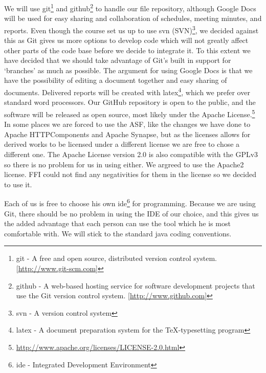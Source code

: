     We will use \gls{git}\footnote{\gls{git} - A free and open source, distributed version control system. [\url{http://www.git-scm.com}]} and \gls{github}\footnote{\gls{github} - A web-based hosting service for software development projects that use the Git version control system. [\url{http://www.github.com}]} to handle our file repository, although Google Docs will be used for easy sharing and collaboration of schedules, meeting minutes, and reports. Even though the course set us up to use \gls{svn} (SVN)\footnote{\gls{svn} - A version control system}, we decided against this as Git gives us more options to develop code which will not greatly affect other parts of the code base before we decide to integrate it. To this extent we have decided that we should take advantage of Git’s built in support for ‘branches’ as much as possible. The argument for using Google Docs is that we have the possibility of editing a document together and easy sharing of documents. Delivered reports will be created with \gls{latex}\footnote{\gls{latex} - A document preparation system for the \TeX -typesetting program}, which we prefer over standard word processors. Our GitHub repository is open to the public, and the software will be released as open source, most likely under the Apache License.\footnote{\url{http://www.apache.org/licenses/LICENSE-2.0.html}} In some places we are forced to use the ASF, like the changes we have done to Apache HTTPComponents and Apache Synapse, but as the licenses allows for derived works to be licensed under a different license we are free to chose a different one. The Apache License version 2.0 is also compatible with the GPLv3 so there is no problem for us in using either. 
    We argreed to use the Apache2 license. FFI could not find any negativities for them in the license so we decided to use it. 

    Each of us is free to choose his own \gls{ide}\footnote{\gls{ide} - Integrated Development Environment} for programming. Because we are using Git, there should be no problem in using the IDE of our choice, and this gives us the added advantage that each person can use the tool which he is most comfortable with. We will stick to the standard \gls{java coding conventions}.
    

